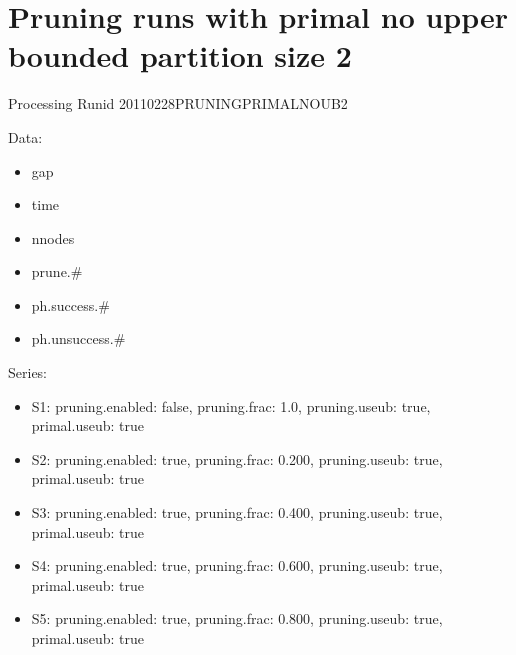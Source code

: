 \documentclass[landscape, 12pt]{report}
\begin{document}
\section{Pruning runs with primal no upper bounded partition size 2}

Processing Runid 20110228PRUNINGPRIMALNOUB2

Data:
\begin{itemize}
\item gap
\item time
\item nnodes
\item prune.\#
\item ph.success.\#
\item ph.unsuccess.\#
\end{itemize}
Series:
\begin{itemize}
\item S1: pruning.enabled: false, pruning.frac: 1.0, pruning.useub: true, primal.useub: true
\item S2: pruning.enabled: true, pruning.frac: 0.200, pruning.useub: true, primal.useub: true
\item S3: pruning.enabled: true, pruning.frac: 0.400, pruning.useub: true, primal.useub: true
\item S4: pruning.enabled: true, pruning.frac: 0.600, pruning.useub: true, primal.useub: true
\item S5: pruning.enabled: true, pruning.frac: 0.800, pruning.useub: true, primal.useub: true
\end{itemize}
\end{document}
